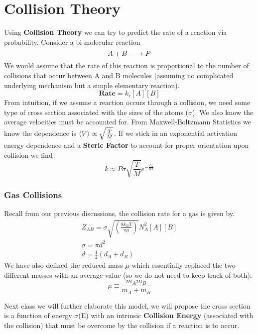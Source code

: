 \documentclass{article}
\newcommand{\be}{\begin{equation}}
\newcommand{\ee}{\end{equation}}
\begin{document}
 \section*{Collision Theory}
 Using \textbf{Collision Theory} we can try to predict the rate of a reaction via probability. 
 Consider a bi-molecular reaction
 \be
 A + B \ce{->} P
 \ee
 We would assume that the rate of this reaction is proportional to the number of collisions that occur between A and B molecules (assuming no complicated underlying mechanism but a simple elementary reaction). 
 \be
 \textbf{Rate} = k_r[A][B]
 \ee
 From intuition, if we assume a reaction occurs through a collision, we need  some type of cross section associated with the sizes of the atoms ($\sigma$).
 We also know the average velocities must be accounted for.
 From Maxwell-Boltzmann Statistics we know the dependence is $\braket{V} \propto \sqrt{\frac{T}{M}}$.
 If we stick in an exponential activation energy dependence and a \textbf{Steric Factor} to account for proper orientation upon collision we find
 \be
 k \approx P\sigma \sqrt{\frac{T}{M}}e^{-\frac{E_a}{RT}}
 \ee
 
 \subsubsection*{Gas Collisions}
 Recall from our previous discussions, the collision rate for a gas is given by. 
 \be
 \begin{split}
     Z_{AB} = \sigma \sqrt{\left(\frac{8k_BT}{\pi \mu}\right)}N_A^2[A][B]\\
     \sigma = \pi d^2\\
     d = \frac{1}{2}(d_A+ d_B)
 \end{split}
 \ee
 We have also defined the reduced mass $\mu$ which essentially replaced the two different masses with an average value (so we do not need to keep track of both). 
 \be
 \mu \equiv \frac{m_Am_B}{m_A+m_B}
 \ee
 
 Next class we will further elaborate this model, we will propose the cross section is a function of energy $\sigma$(E) with an intrinsic \textbf{Collision Energy} (associated with the collision) that must be overcome by the collision if a reaction is to occur. 
 
\end{document}
